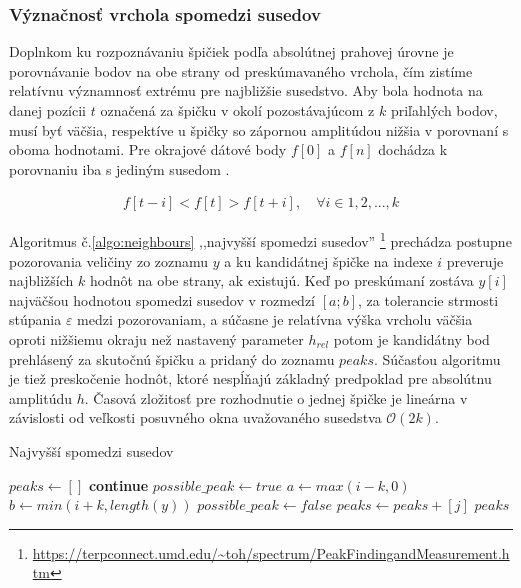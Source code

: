 \subsubsection{Význačnosť vrchola spomedzi susedov}
Doplnkom ku rozpoznávaniu špičiek podľa absolútnej prahovej úrovne je porovnávanie bodov na 
obe strany od preskúmavaného vrchola, čím zistíme relatívnu významnosť extrému pre najbližšie susedstvo.
Aby bola hodnota na danej pozícii $t$ označená za špičku v okolí pozostávajúcom z $k$ priľahlých bodov,
musí byť väčšia, respektíve u špičky so zápornou amplitúdou nižšia v porovnaní s oboma hodnotami.
Pre okrajové dátové body $f[0]$ a $f[n]$ dochádza k porovnaniu iba s jediným susedom \cite{survey-peaks-valleys}.
\begin{ceqn}\begin{align}
f[t-i] < f[t] > f[t+i],\quad \forall i \in 1, 2, ..., k
\end{align}\end{ceqn}

Algoritmus č.\ref{algo:neighbours} ,,najvyšší spomedzi susedov'' 
\footnote{\url{https://terpconnect.umd.edu/~toh/spectrum/PeakFindingandMeasurement.htm}} 
prechádza postupne pozorovania veličiny zo zoznamu $y$ a ku kandidátnej špičke na indexe $i$ preveruje najbližších
$k$ hodnôt na obe strany, ak existujú. Keď po preskúmaní zostáva $y[i]$ najväčšou hodnotou spomedzi susedov
v rozmedzí $[a; b]$, za tolerancie strmosti stúpania $\varepsilon$ medzi pozorovaniam, a súčasne je relatívna 
výška vrcholu väčšia oproti nižšiemu okraju než nastavený parameter $h_{rel}$ potom je kandidátny bod prehlásený
za skutočnú špičku a pridaný do zoznamu $peaks$. Súčasťou algoritmu je tiež preskočenie hodnôt, ktoré nespĺňajú
základný predpoklad pre absolútnu amplitúdu $h$. Časová zložitosť pre rozhodnutie o jednej špičke je
lineárna v závislosti od veľkosti posuvného okna uvažovaného susedstva $\mathcal{O}(2k)$.
 
\begin{algorithm}[h]
\caption{Najvyšší spomedzi susedov}
\begin{algorithmic}[1]
	\State $peaks \gets []$ 	
		  
			\State \textbf{continue}
		\EndIf
		\State $possible\_peak \gets true$
		\State $a \gets max(i - k, 0)$
		\State $b \gets min(i + k, length(y))$
					
				\State $possible\_peak \gets false$     
			\EndIf
		\EndFor
			\State $peaks \gets peaks + [j]$    
		\EndIf
	\EndFor
	\State \Return $peaks$
\EndFunction
\end{algorithmic}
\label{algo:neighbours}
\end{algorithm}

